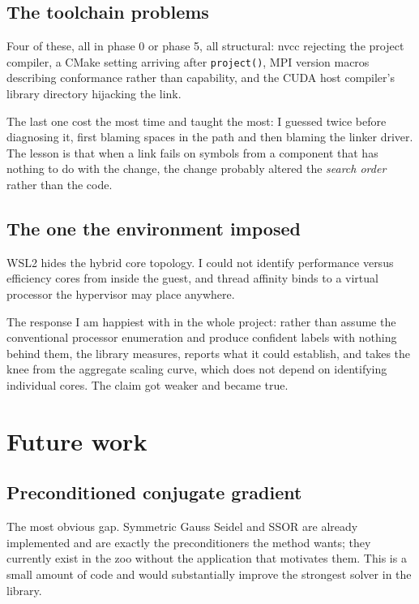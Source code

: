 \documentclass[11pt,a4paper]{report}
\begin{document}
\section{The toolchain problems}

Four of these, all in phase 0 or phase 5, all structural: nvcc rejecting the
project compiler, a CMake setting arriving after \texttt{project()}, MPI version
macros describing conformance rather than capability, and the CUDA host
compiler's library directory hijacking the link.

The last one cost the most time and taught the most: I guessed twice before
diagnosing it, first blaming spaces in the path and then blaming the linker
driver. The lesson is that when a link fails on symbols from a component that has
nothing to do with the change, the change probably altered the \emph{search
order} rather than the code.

\section{The one the environment imposed}

WSL2 hides the hybrid core topology. I could not identify performance versus
efficiency cores from inside the guest, and thread affinity binds to a virtual
processor the hypervisor may place anywhere.

The response I am happiest with in the whole project: rather than assume the
conventional processor enumeration and produce confident labels with nothing
behind them, the library measures, reports what it could establish, and takes the
knee from the aggregate scaling curve, which does not depend on identifying
individual cores. The claim got weaker and became true.

\chapter{Future work}

\section{Preconditioned conjugate gradient}

The most obvious gap. Symmetric Gauss Seidel and SSOR are already implemented and
are exactly the preconditioners the method wants; they currently exist in the zoo
without the application that motivates them. This is a small amount of code and
would substantially improve the strongest solver in the library.
\end{document}
